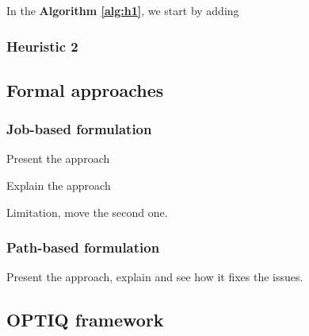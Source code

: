 \documentclass[letter]{article}
\begin{document}







In the \textbf{Algorithm \ref{alg:h1}}, we start by adding 

\subsubsection{Heuristic 2}

\subsection{Formal approaches}

\subsubsection{Job-based formulation}
Present the approach

Explain the approach

Limitation, move the second one.

\subsubsection{Path-based formulation}
Present the approach, explain and see how it fixes the issues.

\subsection{OPTIQ framework}
\end{document}
